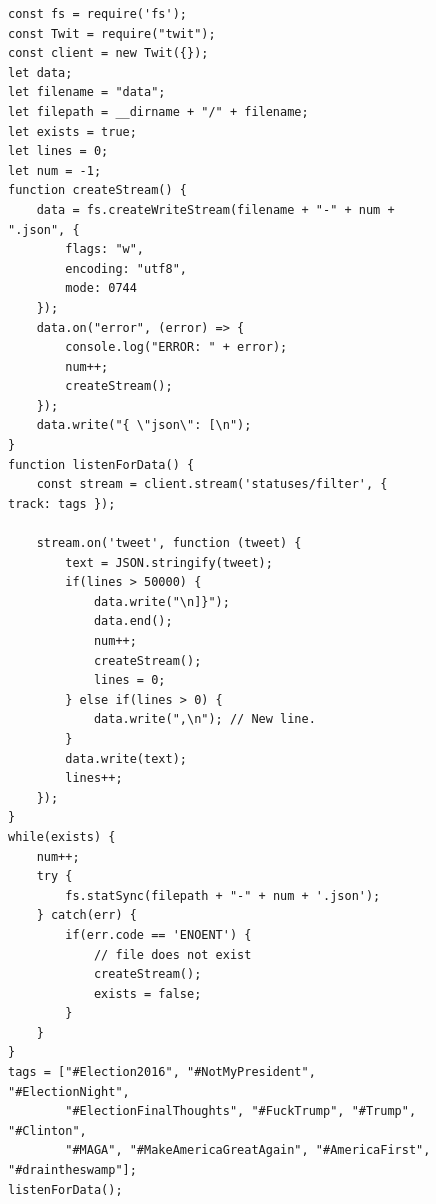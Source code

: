 \documentclass[prodmode]{acmsmall} %
\begin{document}
\begin{figure}[!t]
    \begin{lstlisting}
const fs = require('fs');
const Twit = require("twit");
const client = new Twit({});
let data;
let filename = "data";
let filepath = __dirname + "/" + filename;
let exists = true;
let lines = 0;
let num = -1;
function createStream() {
    data = fs.createWriteStream(filename + "-" + num + ".json", {
        flags: "w",
        encoding: "utf8",
        mode: 0744
    });
    data.on("error", (error) => {
        console.log("ERROR: " + error);
        num++;
        createStream();
    });
    data.write("{ \"json\": [\n");
}
function listenForData() {
    const stream = client.stream('statuses/filter', { track: tags });

    stream.on('tweet', function (tweet) {
        text = JSON.stringify(tweet);
        if(lines > 50000) {
            data.write("\n]}");
            data.end();
            num++;
            createStream();
            lines = 0;
        } else if(lines > 0) {
            data.write(",\n"); // New line.
        }
        data.write(text);
        lines++;
    });
}
while(exists) {
    num++;
    try {
        fs.statSync(filepath + "-" + num + '.json');
    } catch(err) {
        if(err.code == 'ENOENT') {
            // file does not exist
            createStream();
            exists = false;
        }
    }
}
tags = ["#Election2016", "#NotMyPresident", "#ElectionNight",
        "#ElectionFinalThoughts", "#FuckTrump", "#Trump", "#Clinton",
        "#MAGA", "#MakeAmericaGreatAgain", "#AmericaFirst", "#draintheswamp"];
listenForData();
\end{lstlisting}
\end{figure}
\end{document}
